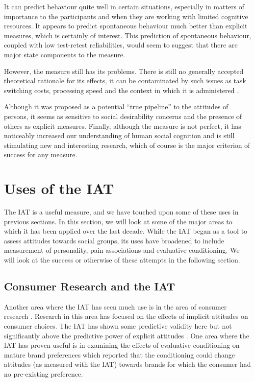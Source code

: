 It can predict behaviour quite well in certain situations, especially in matters of importance to the participants and when they are working with limited cognitive resources. It appears to predict spontaneous behaviour much better than explicit measures, which is certainly of interest. This prediction of spontaneous behaviour, coupled with low test-retest reliabilities, would seem to suggest that there are major state components to the measure. 

However, the measure still has its problems. There is still no generally accepted theoretical rationale for its effects, it can be contaminated by such issues as task switching costs\cite{Klauer2005}, processing speed\cite{Blanton2006} and the context in which it is administered \cite{Boysen2006}. 

Although it was proposed as a potential ``true pipeline'' to the attitudes of persons, it seems as sensitive to social desirability concerns and the presence of others as explicit measures. Finally, although the measure is not perfect, it has noticeably increased our understanding of human social cognition and is still stimulating new and interesting research, which of course is the major criterion of success for any measure. 

\section{Uses of the IAT}%
\label{sec:uses-iat}

The IAT is a useful measure, and we have touched upon some of these uses in previous sections. In this section, we will look at some of the major areas to which it has been applied over the last decade. While the IAT began as a tool to assess attitudes towards social groups, its uses have broadened to include measurement of personality, pain associations and evaluative conditioning. We will look at the success or otherwise of these attempts in the following section. 

\subsection{Consumer Research and the IAT}
\label{sec:cons-rese-iat}

Another area where the IAT has seen much use is in the area of consumer research \cite{Lane2007,Maison2001}. Research in this area has focused on the effects of implicit attitudes on consumer choices. The IAT has shown some predictive validity here \cite{Maison2004}  but not significantly above the predictive power of explicit attitudes \cite{Greenwald2009}. One area where the IAT has proven useful is in examining the effects of evaluative conditioning on mature brand preferences \cite{Gibson2008} which reported that the conditioning could change attitudes (as measured with the IAT) towards brands for which the consumer had no pre-existing preference.

